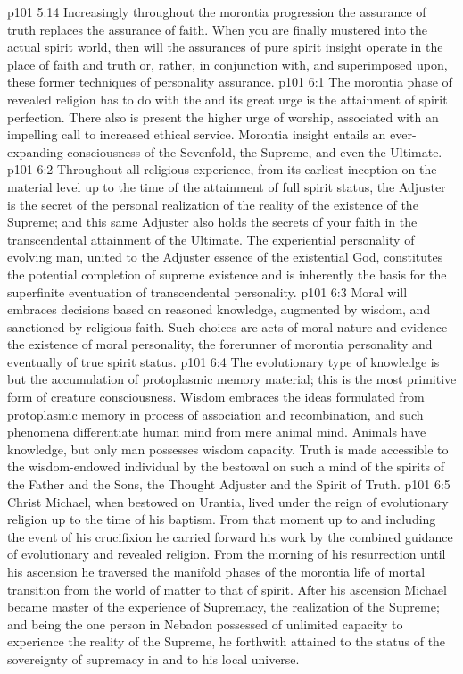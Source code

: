 \vs p101 5:14 Increasingly throughout the morontia progression the assurance of truth replaces the assurance of faith. When you are finally mustered into the actual spirit world, then will the assurances of pure spirit insight operate in the place of faith and truth or, rather, in conjunction with, and superimposed upon, these former techniques of personality assurance.
\vs p101 6:1 The morontia phase of revealed religion has to do with the  and its great urge is the attainment of spirit perfection. There also is present the higher urge of worship, associated with an impelling call to increased ethical service. Morontia insight entails an ever\hyp{}expanding consciousness of the Sevenfold, the Supreme, and even the Ultimate.
\vs p101 6:2 Throughout all religious experience, from its earliest inception on the material level up to the time of the attainment of full spirit status, the Adjuster is the secret of the personal realization of the reality of the existence of the Supreme; and this same Adjuster also holds the secrets of your faith in the transcendental attainment of the Ultimate. The experiential personality of evolving man, united to the Adjuster essence of the existential God, constitutes the potential completion of supreme existence and is inherently the basis for the superfinite eventuation of transcendental personality.
\vs p101 6:3 \pc Moral will embraces decisions based on reasoned knowledge, augmented by wisdom, and sanctioned by religious faith. Such choices are acts of moral nature and evidence the existence of moral personality, the forerunner of morontia personality and eventually of true spirit status.
\vs p101 6:4 The evolutionary type of knowledge is but the accumulation of protoplasmic memory material; this is the most primitive form of creature consciousness. Wisdom embraces the ideas formulated from protoplasmic memory in process of association and recombination, and such phenomena differentiate human mind from mere animal mind. Animals have knowledge, but only man possesses wisdom capacity. Truth is made accessible to the wisdom\hyp{}endowed individual by the bestowal on such a mind of the spirits of the Father and the Sons, the Thought Adjuster and the Spirit of Truth.
\vs p101 6:5 \pc Christ Michael, when bestowed on Urantia, lived under the reign of evolutionary religion up to the time of his baptism. From that moment up to and including the event of his crucifixion he carried forward his work by the combined guidance of evolutionary and revealed religion. From the morning of his resurrection until his ascension he traversed the manifold phases of the morontia life of mortal transition from the world of matter to that of spirit. After his ascension Michael became master of the experience of Supremacy, the realization of the Supreme; and being the one person in Nebadon possessed of unlimited capacity to experience the reality of the Supreme, he forthwith attained to the status of the sovereignty of supremacy in and to his local universe.
